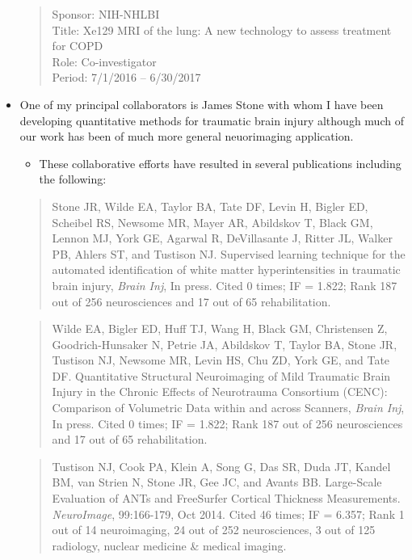 \documentclass[11pt,]{article}
\providecommand{\tightlist}{%
  \setlength{\itemsep}{0pt}\setlength{\parskip}{0pt}}
\begin{document}
\begin{itemize}
  \begin{quote}
  Sponsor: NIH-NHLBI\\
  Title: Xe129 MRI of the lung: A new technology to assess treatment for
  COPD\\
  Role: Co-investigator\\
  Period: 7/1/2016 -- 6/30/2017
  \end{quote}
\item
  One of my principal collaborators is James Stone with whom I have been
  developing quantitative methods for traumatic brain injury although
  much of our work has been of much more general neuorimaging
  application.

  \begin{itemize}
  \tightlist
  \item
    These collaborative efforts have resulted in several publications
    including the following:
  \end{itemize}

  \begin{quote}
  Stone JR, Wilde EA, Taylor BA, Tate DF, Levin H, Bigler ED, Scheibel
  RS, Newsome MR, Mayer AR, Abildskov T, Black GM, Lennon MJ, York GE,
  Agarwal R, DeVillasante J, Ritter JL, Walker PB, Ahlers ST, and
  Tustison NJ. Supervised learning technique for the automated
  identification of white matter hyperintensities in traumatic brain
  injury, \emph{Brain Inj}, In press. Cited 0 times; IF = 1.822; Rank
  187 out of 256 neurosciences and 17 out of 65 rehabilitation.
  \end{quote}

  \begin{quote}
  Wilde EA, Bigler ED, Huff TJ, Wang H, Black GM, Christensen Z,
  Goodrich-Hunsaker N, Petrie JA, Abildskov T, Taylor BA, Stone JR,
  Tustison NJ, Newsome MR, Levin HS, Chu ZD, York GE, and Tate DF.
  Quantitative Structural Neuroimaging of Mild Traumatic Brain Injury in
  the Chronic Effects of Neurotrauma Consortium (CENC): Comparison of
  Volumetric Data within and across Scanners, \emph{Brain Inj}, In
  press. Cited 0 times; IF = 1.822; Rank 187 out of 256 neurosciences
  and 17 out of 65 rehabilitation.
  \end{quote}

  \begin{quote}
  Tustison NJ, Cook PA, Klein A, Song G, Das SR, Duda JT, Kandel BM, van
  Strien N, Stone JR, Gee JC, and Avants BB. Large-Scale Evaluation of
  ANTs and FreeSurfer Cortical Thickness Measurements.
  \emph{NeuroImage}, 99:166-179, Oct 2014. Cited 46 times; IF = 6.357;
  Rank 1 out of 14 neuroimaging, 24 out of 252 neurosciences, 3 out of
  125 radiology, nuclear medicine \& medical imaging.
  \end{quote}


\end{itemize}
\end{document}
